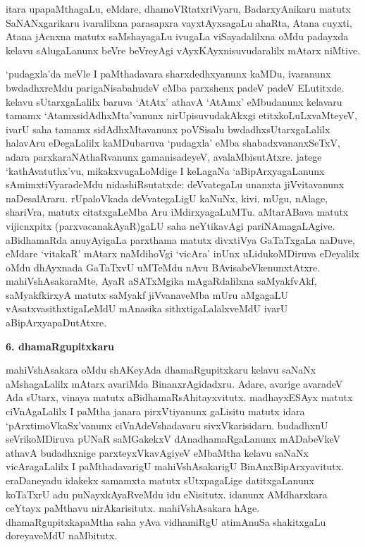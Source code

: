 itara upapaMthagaLu, eMdare, dhamoVRtatxriVyaru, BadarxyAnikaru matutx SaNANxgarikaru ivaralilxna parasapxra vayxtAyxsagaLu ahaRta, Atana cuyxti, Atana jAcnxna matutx saMshayagaLu ivugaLa viSayadalilxna oMdu padayxda kelavu sAlugaLanunx beVre beVreyAgi vAyxKAyxnisuvudaralilx mAtarx niMtive.

`pudagxla'da meVle I paMthadavara sharxdedhxyanunx kaMDu, ivaranunx bwdadhxreMdu parigaNisabahudeV eMba parxshenx padeV padeV ELutitxde. kelavu sUtarxgaLalilx baruva `AtAtx' athavA `AtAmx' eMbudanunx kelavaru tamamx `AtamxsidAdhxMta'vanunx nirUpisuvudakAkxgi etitxkoLuLxvaMteyeV, ivarU saha tamamx sidAdhxMtavanunx poVSisalu bwdadhxsUtarxgaLalilx halavAru eDegaLalilx kaMDubaruva `pudagxla' eMba shabadxvananxSeTxV, adara parxkaraNAthaRvanunx gamanisadeyeV, avalaMbisutAtxre. jatege `kathAvatuthx'vu, mikakxvugaLoMdige I keLagaNa `aBipArxyagaLanunx sAmimxtiVyaradeMdu nidashiRsutatxde: deVvategaLu unanxta jiVvitavanunx naDesalAraru. rUpaloVkada deVvategaLigU kaNuNx, kivi, mUgu, nAlage, shariVra, matutx citatxgaLeMba Aru iMdirxyagaLuMTu. aMtarABava matutx vijicnxpitx (parxvacanakAyaR)gaLU saha neYtikavAgi pariNAmagaLAgive. aBidhamaRda anuyAyigaLa parxthama matutx divxtiVya GaTaTxgaLa naDuve, eMdare `vitakaR' mAtarx naMdihoVgi `vicAra' inUnx uLidukoMDiruva eDeyalilx oMdu dhAyxnada GaTaTxvU uMTeMdu nAvu BAvisabeVkenunxtAtxre. mahiVshAsakaraMte, AyaR aSATxMgika mAgaRdalilxna saMyakfvAkf, saMyakfkirxyA matutx saMyakf jiVvanaveMba mUru aMgagaLU vAsatxvasithxtigaLeMdU mAnasika sithxtigaLalalxveMdU ivarU aBipArxyapaDutAtxre.

\begin{center}
{\textbf{\Large 6. dhamaRgupitxkaru}}
\end{center}

mahiVshAsakara oMdu shAKeyAda dhamaRgupitxkaru kelavu saNaNx aMshagaLalilx mAtarx avariMda BinanxrAgidadxru. Adare, avarige avaradeV Ada sUtarx, vinaya matutx aBidhamaRsAhitayxvitutx. madhayxESAyx matutx ciVnAgaLalilx I paMtha janara pirxVtiyanunx gaLisitu matutx idara `pArxtimoVkaSx'vanunx ciVnAdeVshadavaru sivxVkarisidaru. budadhxnU seVrikoMDiruva pUNaR saMGakekxV dAnadhamaRgaLanunx mADabeVkeV athavA budadhxnige parxteyxVkavAgiyeV eMbaMtha kelavu saNaNx vicAragaLalilx I paMthadavarigU mahiVshAsakarigU BinAnxBipArxyavitutx. eraDaneyadu idakekx samamxta matutx sUtxpagaLige datitxgaLanunx koTaTxrU adu puNayxkAyaRveMdu idu eNisitutx. idanunx AMdharxkara ceYtayx paMthavu nirAkarisitutx. mahiVshAsakara hAge. dhamaRgupitxkapaMtha saha yAva vidhamiRgU atimAnuSa shakitxgaLu doreyaveMdU naMbitutx.

